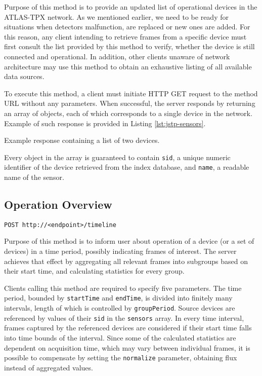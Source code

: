 Purpose of this method is to provide an updated list of operational devices in the ATLAS-TPX network. As we mentioned earlier, we need to be ready for situations when detectors malfunction, are replaced or new ones are added. For this reason, any client intending to retrieve frames from a specific device must first consult the list provided by this method to verify, whether the device is still connected and operational. In addition, other clients unaware of network architecture may use this method to obtain an exhaustive listing of all available data sources.

To execute this method, a client must initiate HTTP GET request to the method URL without any parameters. When successful, the server responds by returning an array of objects, each of which corresponds to a single device in the network. Example of such response is provided in Listing \ref{lst:jstp-sensors}.

\begin{listing}
    \caption{Example response containing a list of two devices.}
    \label{lst:jstp-sensors}
\end{listing}

Every object in the array is guaranteed to contain \texttt{sid}, a unique numeric identifier of the device retrieved from the index database, and \texttt{name}, a readable name of the sensor.

\subsection{Operation Overview}
\hfill
\texttt{POST http://<endpoint>/timeline}

Purpose of this method is to inform user about operation of a device (or a set of devices) in a time period, possibly indicating frames of interest. The server achieves that effect by aggregating all relevant frames into subgroups based on their start time, and calculating statistics for every group.

Clients calling this method are required to specify five parameters. The time period, bounded by \texttt{startTime} and \texttt{endTime}, is divided into finitely many intervals, length of which is controlled by \texttt{groupPeriod}. Source devices are referenced by values of their \texttt{sid} in the \texttt{sensors} array. In every time interval, frames captured by the referenced devices are considered if their start time falls into time bounds of the interval. Since some of the calculated statistics are dependent on acquisition time, which may vary between individual frames, it is possible to compensate by setting the \texttt{normalize} parameter, obtaining flux instead of aggregated values.


